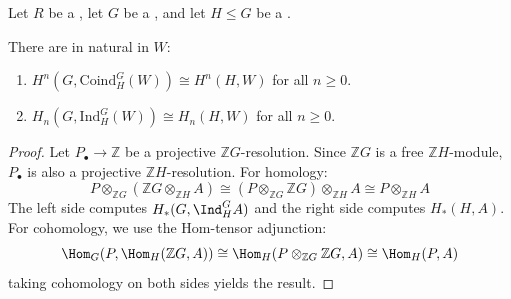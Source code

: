 \begin{theorem} \label{theorem:shapiros_lemma_for_group_homology_cohomology_of_a_module_over_a_group_ring_over_a_ring_and_of_its_induced_or_coinduced_module}
    Let $R$ be a , let $G$ be a , and let $H \leq G$ be a . 

    There are  in  natural in  $W$:
    \begin{enumerate}
        \item $H^n(G, \text{Coind}^G_H(W)) \cong H^n(H, W)$ for all $n \geq 0$.
        \item $H_n(G, \text{Ind}^G_H(W)) \cong H_n(H, W)$ for all $n \geq 0$.
    \end{enumerate}
\end{theorem}

\begin{proof}
    Let $P_\bullet \to \mathbb{Z}$ be a projective $\mathbb{Z}G$-resolution. Since $\mathbb{Z}G$ is a free $\mathbb{Z}H$-module, $P_\bullet$ is also a projective $\mathbb{Z}H$-resolution.
    For homology:
    $$ P \otimes_{\mathbb{Z}G} (\mathbb{Z}G \otimes_{\mathbb{Z}H} A) \cong (P \otimes_{\mathbb{Z}G} \mathbb{Z}G) \otimes_{\mathbb{Z}H} A \cong P \otimes_{\mathbb{Z}H} A $$
    The left side computes $H_*(G, \Ind_H^G A)$ and the right side computes $H_*(H, A)$.
    For cohomology, we use the Hom-tensor adjunction:
    $$ \Hom_G(P, \Hom_H(\mathbb{Z}G, A)) \cong \Hom_H(P \otimes_{\mathbb{Z}G} \mathbb{Z}G, A) \cong \Hom_H(P, A) $$
    taking cohomology on both sides yields the result.
\end{proof}